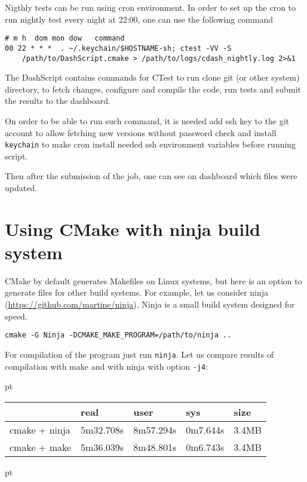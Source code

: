 \documentclass[a4paper,10pt]{article}
\begin{document}
Nigthly tests can be run using cron environment. In order to set up the cron to run nightly test every night at 22:00, one can use the following command
\begin{verbatim}
# m h  dom mon dow   command
00 22 * * *  . ~/.keychain/$HOSTNAME-sh; ctest -VV -S 
    /path/to/DashScript.cmake > /path/to/logs/cdash_nightly.log 2>&1
\end{verbatim}

The DashScript contains commands for CTest to run clone git (or other system) directory, to fetch changes, configure and compile the code, run tests and submit the results to the dashboard.

On order to be able to run such command, it is needed add ssh key to the git account to allow fetching new versions without password check and install \texttt{keychain} to make cron install needed ssh environment variables before running script.

Then after the submission of the job, one can see on dashboard which files were updated.

\section{Using CMake with ninja build system }

CMake by default generates Makefiles on Linux systems, but here is an option to generate files for other build systems. For example, let us consider ninja (\url{https://github.com/martine/ninja}). Ninja is a small build system designed for speed.

\begin{verbatim}
cmake -G Ninja -DCMAKE_MAKE_PROGRAM=/path/to/ninja ..
\end{verbatim}

For compilation of the program just run \texttt{ninja}.
Let us compare results of compilation with make and with ninja with option \texttt{-j4}:

 pt

\begin{tabular}{|l|l|l|l|l|}
	\hline
	& real & user & sys & size\\
	\hline
	cmake + ninja & 5m32.708s & 8m57.294s & 0m7.644s & 3.4MB\\
	cmake + make  & 5m36.039s & 8m48.801s & 0m6.743s & 3.4MB\\
	\hline
\end{tabular}

 pt
\end{document}

